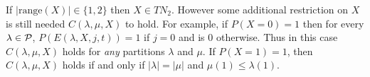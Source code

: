 \documentclass[12pt]{article}
\newcommand{\range}{\text{range}}
\begin{document}
If $|\range(X)| \in \{1,2\}$ then $X \in TN_2$.  However some additional restriction on $X$ is still needed $C(\lambda,\mu,X)$ to hold.  For example, if $P(X=0) = 1$ then for every $\lambda \in {\cal P}$, $P(E(\lambda, X,j,t)) = 1$ if $j=0$ and is $0$ otherwise.  Thus in this case $C(\lambda,\mu,X)$ holds for \emph{any} partitions $\lambda$ and $\mu$.  If $P(X=1)=1$, then $C(\lambda,\mu,X)$ holds if and only if $|\lambda| = |\mu|$ and $\mu(1) \leq \lambda(1)$.



{}

\end{document}
